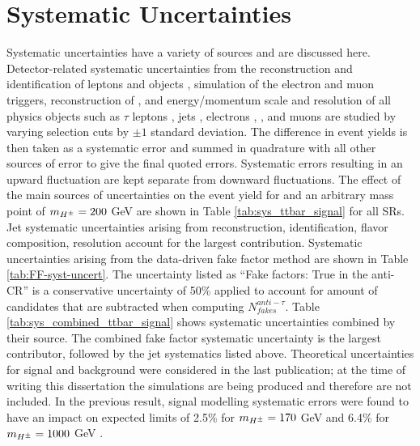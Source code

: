 	\section{Systematic Uncertainties}\label{sec:systs}
		Systematic uncertainties have a variety of sources and are discussed here. Detector-related systematic uncertainties from the reconstruction and identification of leptons and \tauhad objects \cite{tau-calibration}, simulation of the electron and muon triggers, reconstruction of \Etm, and energy/momentum scale and resolution of all physics objects such as $\tau$ leptons \cite{tau-calibration}, jets \cite{jet-calibration}, electrons \cite{egamma-calibration}, \Etm \cite{met-perf}, and muons \cite{muon-calibration} are studied by varying selection cuts by $\pm 1$ standard deviation. The difference in event yields is then taken as a systematic error and summed in quadrature with all other sources of error to give the final quoted errors. Systematic errors resulting in an upward fluctuation are kept separate from downward fluctuations. The effect of the main sources of uncertainties on the event yield for \ttbar and an arbitrary mass point of $m_{H^{\pm}}=200$ GeV are shown in Table \ref{tab:sys_ttbar_signal} for all \glspl{SR}. Jet systematic uncertainties arising from reconstruction, identification, flavor composition, resolution account for the largest contribution. Systematic uncertainties arising from the data-driven fake factor method are shown in Table \ref{tab:FF-syst-uncert}. The uncertainty listed as ``Fake factors: True \tauhad in the anti-\tauhad CR'' is a conservative uncertainty of 50\% applied to account for amount of \tauhad candidates that are subtracted when computing $N^{anti-\tau}_{fakes}$. Table \ref{tab:sys_combined_ttbar_signal} shows systematic uncertainties combined by their source. The combined fake factor systematic uncertainty is the largest contributor, followed by the jet systematics listed above. Theoretical uncertainties for signal and \ttbar background were considered in the last publication; at the time of writing this dissertation the simulations are being produced and therefore are not included. In the previous result, \Hpm signal modelling systematic errors were found to have an impact on expected limits of 2.5\% for $m_{H^{\pm}}=170$ GeV and 6.4\% for $m_{H^{\pm}}=1000$ GeV \cite{hpm-previous}.
		
